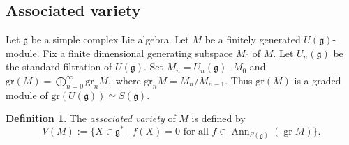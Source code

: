 \documentclass[11pt, reqno]{amsart}
\theoremstyle{definition}
\newtheorem{dfn}[Thm]{Definition}
\numberwithin{equation}{section}
\begin{document}






     





\subsection{Associated variety}
Let $\mathfrak{g}$ be a simple complex Lie algebra. Let $M$ be a  {finitely} generated $U(\mathfrak{g})$-module. Fix a finite dimensional generating subspace $M_0$ of $M$. Let $U_{n}(\mathfrak{g})$ be the standard filtration of $U(\mathfrak{g})$. Set $M_n=U_n(\mathfrak{g})\cdot M_0$ and
\(
\text{gr} (M)=\bigoplus\limits_{n=0}^{\infty} \text{gr}_n M,
\)
where $\text{gr}_n M=M_n/{M_{n-1}}$. Thus $\text{gr}(M)$ is a graded module of $\text{gr}(U(\mathfrak{g}))\simeq S(\mathfrak{g})$.




\begin{dfn}
	The  \textit{associated variety} of $M$ is defined by
	\begin{equation*}
	V(M):=\{X\in \mathfrak{g}^* \mid f(X)=0 \text{ for all~} f\in \operatorname{Ann}_{S(\mathfrak{g})}(\operatorname{gr} M)\}.
	\end{equation*}
\end{dfn}
\end{document}
